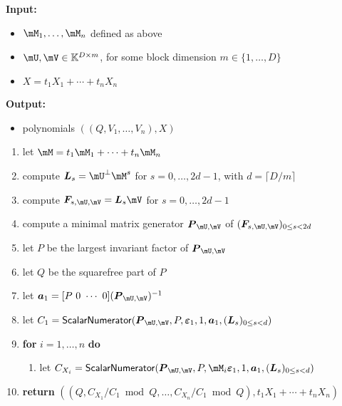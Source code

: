 \documentclass[12pt]{article}
\newcommand{\mat}[1]{\bm{\MakeUppercase{#1}}} %
\newcommand{\row}[1]{\bm{\MakeLowercase{#1}}} %
\newcommand{\col}[1]{\bm{\MakeLowercase{#1}}} %
\newcommand{\seqelt}[1]{\bm{F}_{#1}} %
\newcommand{\minpoly}{P}
\newcommand{\mainalgoname}{\mathsf{ BlockParametrization}}
\newcommand{\lf}{X}
\newcommand{\sqfree}{Q}
\begin{document}
\begin{algorithm}[H]
	\caption{$\mainalgoname(\mM_1,\dots,\mM_n,\mU,\mV,\lf)$}
	{\bf Input:} \vspace{-0.5em}
	\begin{itemize}
		\item $\mM_1,\dots,\mM_n$ defined as above
		\item  $\mU,\mV \in \mathbb{K}^{D \times m}$, for some block dimension  $m \in \{1,\dots,D\}$
                \item $\lf =t_1 X_1 + \cdots + t_n X_n$
	\end{itemize}
	{\bf Output:}  \vspace{-0.5em}
        \begin{itemize}
        \item         polynomials $((\sqfree,V_1,\dots,V_n),\lf)$
        \end{itemize}
  \begin{enumerate}
  \item\label{mainstep1}   let $\mM = t_1 \mM_1 + \cdots + t_n \mM_n$
  \item\label{mainstep3} { compute $\mat{L}_s = \mU^{\perp}\mM^s$ for $s=0,\dots,2d-1$, with $d = \lceil D/m \rceil$}
  \item\label{mainstep4} { compute $\seqelt{s,\mU,\mV}= \mat{L}_s\mV$ for $s=0,\dots, 2d-1$}
  \item\label{mainstep5} { compute a minimal matrix generator $\mat{P}_{\mU,\mV}$ of $(\seqelt{s,\mU,\mV})_{0 \le s < 2d}$}
  \item\label{mainstep6} { let $\minpoly$ be the largest invariant factor of $\mat{P}_{\mU,\mV}$}
  \item\label{mainstep7} { let $\sqfree$ be  the squarefree part  of $\minpoly$}
  \item\label{mainstep8} { let $\row{a}_1 = [P~0 ~\cdots~ 0] (\mat{P}_{\mU,\mV})^{-1}$}
  \item\label{mainstep9}  let $C_1 = \mathsf{{\sf ScalarNumerator}}(\mat{P}_{\mU,\mV}, \minpoly, \col{\varepsilon}_1, 1, \row{a}_1, 
    (\mat{L}_s)_{0 \le s < d})$
  \item\label{mainstep10} \textbf{for} $i=1,\dots,n$ \textbf{do}
    \begin{enumerate}
     \item let $C_{X_i} = \mathsf{{\sf ScalarNumerator}}(\mat{P}_{\mU,\mV}, \minpoly, \mM_i\col{\varepsilon}_1, 1, \row{a}_1, (\mat{L}_s)_{0 \le s < d})$
    \end{enumerate}
\item\label{mainstep11}     \textbf{return} $((\sqfree, C_{X_1}/ C_1 \bmod \sqfree, \dots, C_{X_n}/ C_{1} \bmod \sqfree),t_1 X_1 + \cdots + t_n X_n)$
  \end{enumerate}  \label{algo:block-sparse-fglm}
\end{algorithm}
\end{document}

